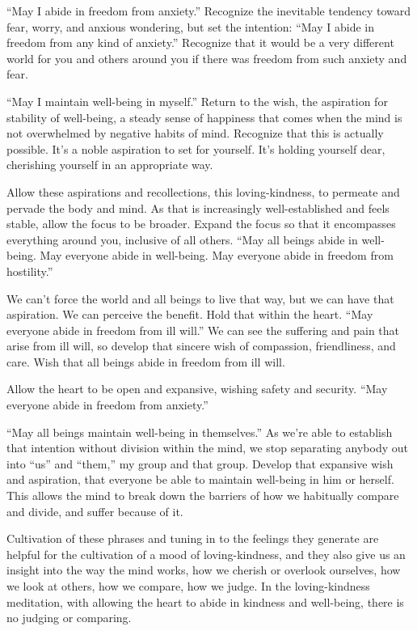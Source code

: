 “May I abide in freedom from anxiety.” Recognize the inevitable tendency
toward fear, worry, and anxious wondering, but set the intention: “May I
abide in freedom from any kind of anxiety.” Recognize that it would be a
very different world for you and others around you if there was freedom
from such anxiety and fear.

“May I maintain well-being in myself.” Return to the wish, the
aspiration for stability of well-being, a steady sense of happiness that
comes when the mind is not overwhelmed by negative habits of mind.
Recognize that this is actually possible. It’s a noble aspiration to set
for yourself. It’s holding yourself dear, cherishing yourself in an
appropriate way.

Allow these aspirations and recollections, this loving-kindness, to
permeate and pervade the body and mind. As that is increasingly
well-established and feels stable, allow the focus to be broader. Expand
the focus so that it encompasses everything around you, inclusive of all
others. “May all beings abide in well-being. May everyone abide in
well-being. May everyone abide in freedom from hostility.”

We can’t force the world and all beings to live that way, but we can
have that aspiration. We can perceive the benefit. Hold that within the
heart. “May everyone abide in freedom from ill will.” We can see the
suffering and pain that arise from ill will, so develop that sincere
wish of compassion, friendliness, and care. Wish that all beings abide
in freedom from ill will.

Allow the heart to be open and expansive, wishing safety and security.
“May everyone abide in freedom from anxiety.”

“May all beings maintain well-being in themselves.” As we’re able to
establish that intention without division within the mind, we stop
separating anybody out into “us” and “them,” my group and that group.
Develop that expansive wish and aspiration, that everyone be able to
maintain well-being in him or herself. This allows the mind to break
down the barriers of how we habitually compare and divide, and suffer
because of it.

Cultivation of these phrases and tuning in to the feelings they generate
are helpful for the cultivation of a mood of loving-kindness, and they
also give us an insight into the way the mind works, how we cherish or
overlook ourselves, how we look at others, how we compare, how we judge.
In the loving-kindness meditation, with allowing the heart to abide in
kindness and well-being, there is no judging or comparing.
